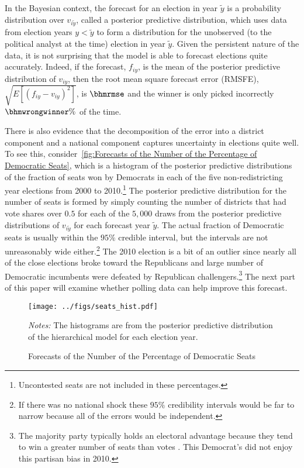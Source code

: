 \documentclass[12pt,final,fleqn]{article}
\theoremstyle{plain}
\begin{document}
In the Bayesian context, the forecast for an election in year $\tilde{y}$ is a probability distribution over $v_{i\tilde{y}}$, called a posterior predictive distribution, which uses data from election years $y < \tilde{y}$ to form a distribution for the unobserved (to the political analyst at the time) election in year $\tilde{y}$. Given the persistent nature of the data, it is not surprising that the model is able to forecast elections quite accurately. Indeed, if the forecast, $f_{iy}$, is the mean of the posterior predictive distribution of $v_{iy}$, then the root mean square forecast error (RMSFE), $\sqrt{E[(f_{iy} - v_{iy})^2]}$, is $\bhmrmse$ and the winner is only picked incorrectly $\bhmwrongwinner\%$ of the time. 

There is also evidence that the decomposition of the error into a district component and a national component captures uncertainty in elections quite well. To see this, consider~\autoref{fig:Forecasts of the Number of the Percentage of Democratic Seats}, which is a histogram of the posterior predictive distributions of the fraction of seats won by Democrats in each of the five non-redistricting year elections from 2000 to 2010.\footnote{Uncontested seats are not included in these percentages.} The posterior predictive distribution for the number of seats is formed by simply counting the number of districts that had vote shares over $0.5$ for each of the $5,000$ draws from the posterior predictive distributions of $v_{i\tilde{y}}$ for each forecast year $\tilde{y}$. The actual fraction of Democratic seats is usually within the $95\%$ credible interval, but the intervals are not unreasonably wide either.\footnote{If there was no national shock these $95\%$ credibility intervals would be far to narrow because all of the errors would be independent.} The 2010 election is a bit of an outlier since nearly all of the close elections broke toward the Republicans and large number of Democratic incumbents were defeated by Republican challengers.\footnote{The majority party typically holds an electoral advantage because they tend to win a greater number of seats than votes \citep{tufte1973relationship}. This Democrat's did not enjoy this partisan bias in 2010.} The next part of this paper will examine whether polling data can help improve this forecast.

\begin{figure}[!htb]
\centering
\texttt{[image: ../figs/seats\_hist.pdf]}
\vspace{.5cm}
\caption{Forecasts of the Number of the Percentage of Democratic Seats}
\label{fig:Forecasts of the Number of the Percentage of Democratic Seats}
\begin{minipage}{\linewidth}
\footnotesize
\emph{Notes:} The histograms are from the posterior predictive distribution of the hierarchical model for each election year.
\end{minipage}
\end{figure}
\end{document}

